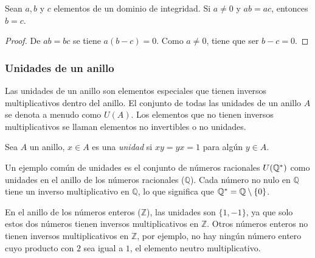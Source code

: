 \begin{proposition}[Cancelación]
	Sean $a, b$ y $c$ elementos de un dominio de integridad. Si $a\ne 0$ y $ab = ac$, entonces $b=c$.
\end{proposition}

\begin{proof}
	De $ab = bc$ se tiene $a(b-c)=0$. Como $a\ne 0$, tiene que ser $b-c=0$.
\end{proof}

\subsubsection{Unidades de un anillo}

Las unidades de un anillo son elementos especiales que tienen inversos multiplicativos dentro del anillo. El conjunto de todas las unidades de un anillo $A$ se denota a menudo como $U(A)$. Los elementos que no tienen inversos multiplicativos se llaman elementos no invertibles o no unidades.

\begin{fmd-definition}
	Sea $A$ un anillo, $x \in A$ es una \textit{unidad} si $xy = yx = 1$ para algún $y \in A$.
\end{fmd-definition}

\begin{example}
	Un ejemplo común de unidades es el conjunto de números racionales $U(\mathbb{Q}^*)$ como unidades en el anillo de los números racionales ($\mathbb{Q}$). Cada número no nulo en $\mathbb{Q}$ tiene un inverso multiplicativo en $\mathbb{Q}$, lo que significa que \(\mathbb{Q}^* = \mathbb{Q} \setminus \{0\}\).
\end{example}
	
\begin{example}
	En el anillo de los números enteros (\(\mathbb{Z}\)), las unidades son \(\{1, -1\}\), ya que solo estos dos números tienen inversos multiplicativos en \(\mathbb{Z}\). Otros números enteros no tienen inversos multiplicativos en \(\mathbb{Z}\), por ejemplo, no hay ningún número entero cuyo producto con \(2\) sea igual a \(1\), el elemento neutro multiplicativo.
\end{example}

